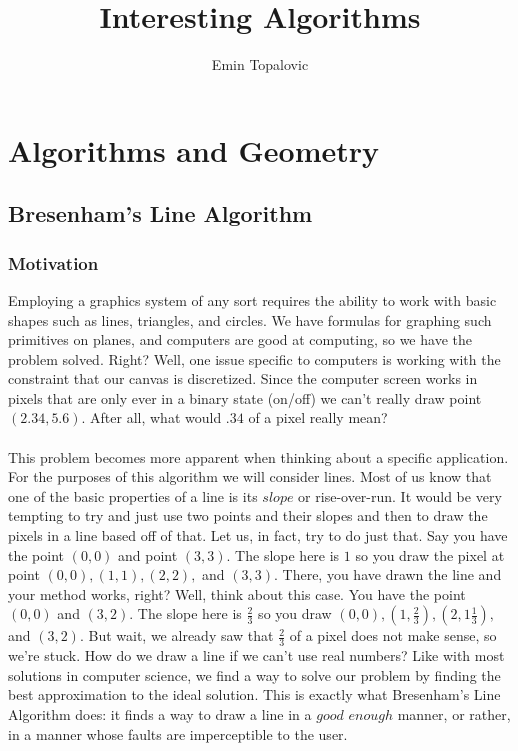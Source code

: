 \documentclass[10pt,a4paper,titlepage]{book}
\author{Emin Topalovic}
\title{Interesting Algorithms}
\begin{document}
\maketitle
{}

\section{Algorithms and Geometry}
\subsection{Bresenham's Line Algorithm}
\subsubsection{Motivation}
Employing a graphics system of any sort requires the ability to work with basic shapes such as lines, triangles, and circles. We have formulas for graphing such primitives on planes, and computers are good at computing, so we have the problem solved. Right? Well, one issue specific to computers is working with the constraint that our canvas is discretized. Since the computer screen works in pixels that are only ever in a binary state (on/off) we can't really draw point $(2.34, 5.6)$. After all, what would $.34$ of a pixel really mean? \\\\

This problem becomes more apparent when thinking about a specific application. For the purposes of this algorithm we will consider lines. Most of us know that one of the basic properties of a line is its $slope$ or rise-over-run. It would be very tempting to try and just use two points and their slopes and then to draw the pixels in a line based off of that. Let us, in fact, try to do just that. Say you have the point $(0,0)$ and point $(3,3)$. The slope here is $1$ so you draw the pixel at point $(0,0), (1,1), (2,2),$ and $(3,3)$. There, you have drawn the line and your method works, right? Well, think about this case. You have the point $(0,0)$ and $(3,2)$. The slope here is $\frac{2}{3}$ so you draw $(0,0), (1,\frac{2}{3}), (2, 1\frac{1}{3}),$ and $(3, 2)$. But wait, we already saw that $\frac{2}{3}$ of a pixel does not make sense, so we're stuck. How do we draw a line if we can't use real numbers? Like with most solutions in computer science, we find a way to solve our problem by finding the best approximation to the ideal solution. This is exactly what Bresenham's Line Algorithm does: it finds a way to draw a line in a $good$ $enough$ manner, or rather, in a manner whose faults are imperceptible to the user.       
\end{document}
